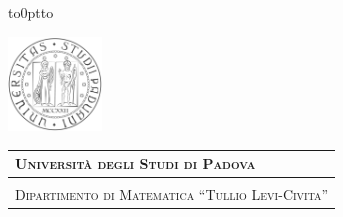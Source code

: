 \begin{titlepage} %
	\begin{center}
		\vbox to0pt{\vbox to\vss}
		
		\hspace{0.5cm}
		\begin{minipage}{.20\textwidth}
			\includegraphics[height=2.5cm]{images/unipd-bn}
		\end{minipage}
		\begin{minipage}{.90\textwidth}
			\begin{table}[H]
				\begin{tabular}{l}
					\scshape{\Large{\bfseries{Universit\`a degli Studi di Padova}}} \\
					\hline \\
					\scshape{\Large{Dipartimento di Matematica ``Tullio Levi-Civita''}} \\
				\end{tabular}
			\end{table}
		\end{minipage}
		

\end{center}
\end{titlepage}
